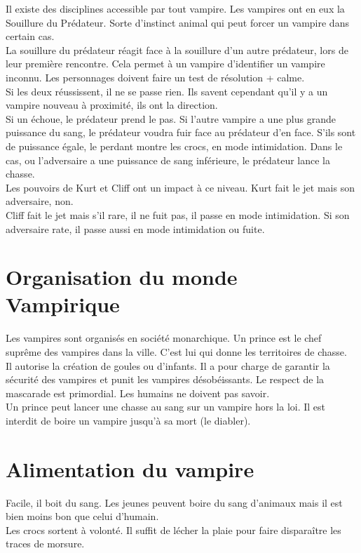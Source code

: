 \documentclass[oneside,12pt]{book}
\begin{document}
\begin{flushleft}
Il existe des disciplines accessible par tout vampire.
Les vampires ont en eux la Souillure du Prédateur. Sorte d'instinct animal qui peut forcer un vampire dans certain cas.\\ 
\vspace{0.5cm}
La souillure du prédateur réagit face à la souillure d'un autre prédateur, lors de leur première rencontre. Cela permet à un vampire d'identifier un vampire inconnu. 
Les personnages doivent faire un test de résolution + calme.\\ 
\vspace{0.5cm}
Si les deux réussissent, il ne se passe rien. Ils savent cependant qu'il y a un vampire nouveau à proximité, ils ont la direction. \\ 
\vspace{0.5cm}
Si un échoue, le prédateur prend le pas. Si l'autre vampire a une plus grande puissance du sang, le prédateur 
voudra fuir face au prédateur d'en face. S'ils sont de puissance égale, le perdant montre les crocs, en mode intimidation. Dans le cas, ou l'adversaire a une puissance de sang inférieure, le prédateur lance la chasse.\\ 
\vspace{0.5cm}
Les pouvoirs de Kurt et Cliff ont un impact à ce niveau. 
Kurt fait le jet mais son adversaire, non. \\
Cliff fait le jet mais s'il rare, il ne fuit pas, il passe en mode intimidation. Si son adversaire rate, il passe aussi en mode intimidation ou fuite.


\section{Organisation du monde Vampirique}
Les vampires sont organisés en société monarchique. 
Un prince est le chef suprême des vampires dans la ville. C'est lui qui donne les territoires de chasse. \\
Il autorise la création de goules ou d'infants. Il a pour charge de garantir la sécurité des vampires et punit les vampires désobéissants. Le respect de la mascarade est primordial. Les humains ne doivent pas savoir. \\
Un prince peut lancer une chasse au sang sur un vampire hors la loi.
Il est interdit de boire un vampire jusqu'à sa mort (le diabler).


\section{Alimentation du vampire}
Facile, il boit du sang. Les jeunes peuvent boire du sang d'animaux mais il est bien moins bon que celui d'humain. \\
Les crocs sortent à volonté. Il suffit de lécher la plaie pour faire disparaître les traces de morsure. 



\end{flushleft}
\end{document}
